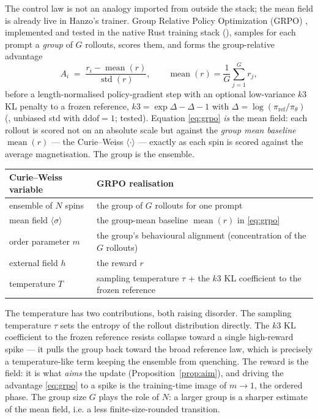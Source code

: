 \documentclass[11pt]{article}
\newcommand{\avg}[1]{\langle #1 \rangle}
\begin{document}
The control law is not an analogy imported from outside the stack; the mean field is already live in Hanzo's
trainer. Group Relative Policy Optimization (GRPO) \cite{shao2024grpo}, implemented and tested in the native
Rust training stack \cite{hanzo-native-training} (), samples for each prompt a
\emph{group} of $G$ rollouts, scores them, and forms the group-relative advantage
\begin{equation}
A_i \;=\; \frac{r_i - \operatorname{mean}(r)}{\operatorname{std}(r)}, \qquad
\operatorname{mean}(r)=\frac1G\sum_{j=1}^G r_j,
\label{eq:grpo}
\end{equation}
before a length-normalised policy-gradient step with an optional low-variance $k3$ KL penalty to a frozen
reference, $k3=\exp\Delta-\Delta-1$ with $\Delta=\log(\pi_{\mathrm{ref}}/\pi_\theta)$
(, unbiased std with $\mathrm{ddof}{=}1$; tested). Equation \eqref{eq:grpo}
\emph{is} the mean field: each rollout is scored not on an absolute scale but against the \emph{group mean
baseline} $\operatorname{mean}(r)$ --- the Curie--Weiss $\avg{\cdot}$ --- exactly as each spin is scored against
the average magnetisation. The group is the ensemble.

\begin{center}
\begin{tabular}{@{}ll@{}}
\toprule
\textbf{Curie--Weiss variable} & \textbf{GRPO realisation} \\
\midrule
ensemble of $N$ spins & the group of $G$ rollouts for one prompt \\
mean field $\avg{\sigma}$ & the group-mean baseline $\operatorname{mean}(r)$ in \eqref{eq:grpo} \\
order parameter $m$ & the group's behavioural alignment (concentration of the $G$ rollouts) \\
external field $h$ & the reward $r$ \\
temperature $T$ & sampling temperature $\tau$ $+$ the $k3$ KL coefficient to the frozen reference \\
\bottomrule
\end{tabular}
\end{center}

The temperature has two contributions, both raising disorder. The sampling temperature $\tau$ sets the entropy
of the rollout distribution directly. The $k3$ KL coefficient to the frozen reference resists collapse toward a
single high-reward spike --- it pulls the group back toward the broad reference law, which is precisely a
temperature-like term keeping the ensemble from quenching. The reward is the field: it is what \emph{aims} the
update (Proposition~\ref{prop:aim}), and driving the advantage \eqref{eq:grpo} to a spike is the training-time
image of $m\to1$, the ordered phase. The group size $G$ plays the role of $N$: a larger group is a sharper
estimate of the mean field, i.e. a less finite-size-rounded transition.
\end{document}
